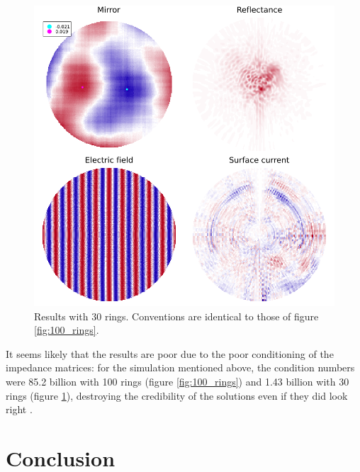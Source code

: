 \documentclass[etd,senior,noacknowledgments]{BYUPhys}
\begin{document}
\begin{figure}
  \centerline{\includegraphics[width=\textwidth]{30-ring-results}}
  \caption[Results with 30 rings]{\label{fig:30_rings}
    Results with 30 rings. Conventions are identical to those of figure \ref{fig:100_rings}.}
\end{figure}

It seems likely that the results are poor due to the poor conditioning of the impedance matrices: for the simulation mentioned above, the condition numbers were 85.2 billion with 100 rings (figure \ref{fig:100_rings}) and 1.43 billion with 30 rings (figure \ref{fig:30_rings}), destroying the credibility of the solutions even if they did look right \cite{KincaidCheney}.







\chapter{Conclusion}\label{chap:conclusion}
\end{document}
